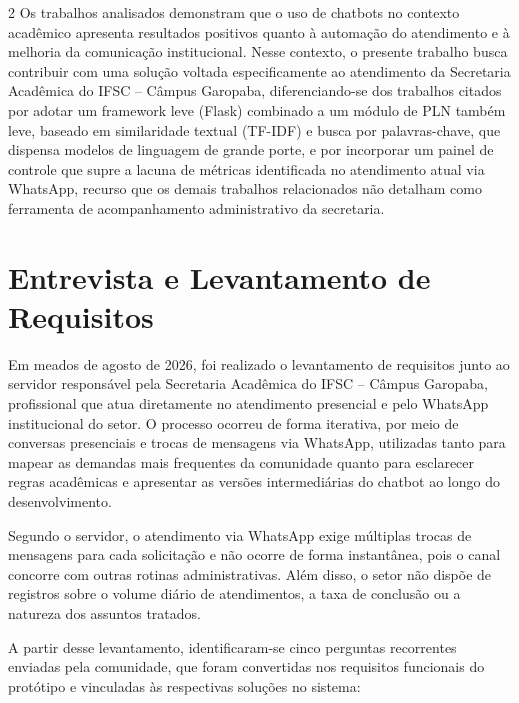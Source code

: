\documentclass[10pt]{article}
\begin{document}
\begin{multicols}{2}
Os trabalhos analisados demonstram que o uso de chatbots no contexto
acadêmico apresenta resultados positivos quanto à automação do
atendimento e à melhoria da comunicação institucional. Nesse contexto, o
presente trabalho busca contribuir com uma solução voltada
especificamente ao atendimento da Secretaria Acadêmica do IFSC -- Câmpus
Garopaba, diferenciando-se dos trabalhos citados por adotar um framework
leve (Flask) combinado a um módulo de PLN também leve, baseado em similaridade textual (TF-IDF) e busca por palavras-chave, que dispensa modelos de linguagem de grande porte, e por incorporar um painel de controle que supre a lacuna de métricas
identificada no atendimento atual via WhatsApp, recurso que os demais
trabalhos relacionados não detalham como ferramenta de acompanhamento
administrativo da secretaria.

\section{Entrevista e Levantamento de Requisitos}\label{sec:entrevista}

Em meados de agosto de 2026, foi realizado o levantamento de requisitos
junto ao servidor responsável pela Secretaria Acadêmica do IFSC -- Câmpus
Garopaba, profissional que atua diretamente no atendimento presencial e
pelo WhatsApp institucional do setor. O processo ocorreu de forma
iterativa, por meio de conversas presenciais e trocas de mensagens via
WhatsApp, utilizadas tanto para mapear as demandas mais frequentes da
comunidade quanto para esclarecer regras acadêmicas e apresentar as
versões intermediárias do chatbot ao longo do desenvolvimento.

Segundo o servidor, o atendimento via WhatsApp exige múltiplas trocas de
mensagens para cada solicitação e não ocorre de forma instantânea, pois o
canal concorre com outras rotinas administrativas. Além disso, o setor
não dispõe de registros sobre o volume diário de atendimentos, a taxa de
conclusão ou a natureza dos assuntos tratados.

A partir desse levantamento, identificaram-se cinco perguntas
recorrentes enviadas pela comunidade, que foram convertidas nos
requisitos funcionais do protótipo e vinculadas às respectivas soluções
no sistema:


\end{multicols}
\end{document}
